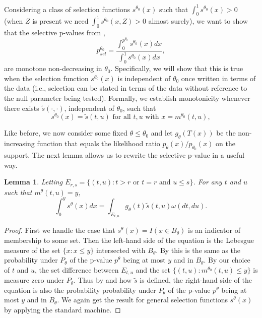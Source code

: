 \documentclass{article}
\newtheorem{lemma}{Lemma}
\begin{document}
\begin{appendix}
Considering a class of selection functions $s^{\theta_0}(x)$ such that $\int_0^1 s^{\theta_0}(x) > 0$ (when $Z$ is present we need $\int_0^1 s^{\theta_0}(x, Z) > 0$ almost surely), we want to show that the selective p-values from , 
\begin{equation*}
    p^{\theta_0}_{sel} = \frac{\int_{0}^{p^{\theta_0}} s^{\theta_0}(x) dx}{\int_{0}^{1} s^{\theta_0}(x) dx},
\end{equation*}
are monotone non-decreasing in $\theta_0$. Specifically, we will show that this is true when the selection function $s^{\theta_0}(x)$ is independent of $\theta_0$ once written in terms of the data (i.e., selection can be stated in terms of the data without reference to the null parameter being tested). Formally, we establish monotonicity whenever there exists $\tilde{s}(\cdot, \cdot)$, independent of $\theta_0$, such that 
\begin{equation*}
    s^{\theta_0}(x) = \tilde{s}(t, u) \text{ for all } t, u \text{ with } x = m^{\theta_0}(t, u), 
\end{equation*}

Like before, we now consider some fixed $\theta \leq \theta_0$ and let $g_{\theta}(T(x))$ be the non-increasing function that equals the likelihood ratio $p_{\theta}(x)/p_{\theta_0}(x)$ on the support. The next lemma allows us to rewrite the selective p-value in a useful way. 

\begin{lemma} Letting $E_{r, s} = \{(t, u) : t > r \text{ or } t = r \text{ and } u \leq s \}$. For any $t$ and $u$ such that $m^{\theta}(t, u) = y$,
\begin{equation*}
    \int_0^y s^{\theta}(x) dx = \int_{E_{t, u}} g_{\theta}(t) \tilde{s}(t, u) \omega(dt, du). 
\end{equation*}
\end{lemma}
\begin{proof}
   First we handle the case that $s^{\theta}(x) = I(x \in B_{\theta})$ is an indicator of membership to some set. Then the left-hand side of the equation is the Lebesgue measure of the set $\{x : x \leq y \}$ intersected with $B_{\theta}$. By  this is the same as the probability under $P_{\theta}$ of the p-value $p^{\theta}$ being at most $y$ and in $B_{\theta}$. By our choice of $t$ and $u$, the set difference between $E_{t, u}$ and the set $\{(t, u): m^{\theta_0}(t, u) \leq y \}$ is measure zero under $P_{\theta}$. Thus by  and how $\tilde{s}$ is defined, the right-hand side of the equation is also the probability  probability under $P_{\theta}$ of the p-value $p^{\theta}$ being at most $y$ and in $B_{\theta}$. We again get the result for general selection functions $s^{\theta}(x)$ by applying the standard machine. 
\end{proof}


\end{appendix}
\end{document}
